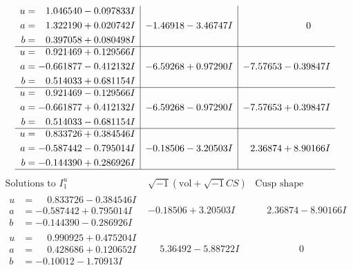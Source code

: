 \documentclass[1p]{elsarticle_modified}
\theoremstyle{definition}
\newcommand{\I}{\sqrt{-1}}
\begin{document}
$$\begin{array}{c|c|c}
\begin{aligned}
u &= \phantom{-}1.046540 - 0.097833 I \\
a &= \phantom{-}1.322190 + 0.020742 I \\
b &= \phantom{-}0.397058 + 0.080498 I\end{aligned}
 & -1.46918 - 3.46747 I & \phantom{-0.000000 } 0 \\ \hline\begin{aligned}
u &= \phantom{-}0.921469 + 0.129566 I \\
a &= -0.661877 - 0.412132 I \\
b &= \phantom{-}0.514033 + 0.681154 I\end{aligned}
 & -6.59268 + 0.97290 I & -7.57653 - 0.39847 I \\ \hline\begin{aligned}
u &= \phantom{-}0.921469 - 0.129566 I \\
a &= -0.661877 + 0.412132 I \\
b &= \phantom{-}0.514033 - 0.681154 I\end{aligned}
 & -6.59268 - 0.97290 I & -7.57653 + 0.39847 I \\ \hline\begin{aligned}
u &= \phantom{-}0.833726 + 0.384546 I \\
a &= -0.587442 - 0.795014 I \\
b &= -0.144390 + 0.286926 I\end{aligned}
 & -0.18506 - 3.20503 I & \phantom{-}2.36874 + 8.90166 I\\
 \hline 
 \end{array}$$\newpage$$\begin{array}{c|c|c}  
\text{Solutions to }I^u_{1}& \I (\text{vol} + \sqrt{-1}CS) & \text{Cusp shape}\\
 \hline 
\begin{aligned}
u &= \phantom{-}0.833726 - 0.384546 I \\
a &= -0.587442 + 0.795014 I \\
b &= -0.144390 - 0.286926 I\end{aligned}
 & -0.18506 + 3.20503 I & \phantom{-}2.36874 - 8.90166 I \\ \hline\begin{aligned}
u &= \phantom{-}0.990925 + 0.475204 I \\
a &= \phantom{-}0.428686 + 0.120652 I \\
b &= -0.10012 - 1.70913 I\end{aligned}
 & \phantom{-}5.36492 - 5.88722 I & \phantom{-0.000000 } 0 \\ \hline\begin{aligned}

\end{aligned}
\end{array}$$
\end{document}
